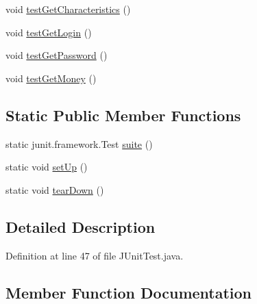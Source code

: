 \begin{DoxyCompactItemize}
\item 
void \hyperlink{classes_1_1deusto_1_1server_1_1_j_unit_test_adfe6c8de32fe489f31f62338a475729e}{test\+Get\+Characteristics} ()
\item 
void \hyperlink{classes_1_1deusto_1_1server_1_1_j_unit_test_a6c7354d3207f6f6e8778d1b85fd31746}{test\+Get\+Login} ()
\item 
void \hyperlink{classes_1_1deusto_1_1server_1_1_j_unit_test_aac72817037da417d5eb5b32078971398}{test\+Get\+Password} ()
\item 
void \hyperlink{classes_1_1deusto_1_1server_1_1_j_unit_test_a6204483b84dccff7e6dd2e98d9b20b1b}{test\+Get\+Money} ()
\end{DoxyCompactItemize}
\subsection*{Static Public Member Functions}
\begin{DoxyCompactItemize}
\item 
static junit.\+framework.\+Test \hyperlink{classes_1_1deusto_1_1server_1_1_j_unit_test_ae981ce8acebd33a65ebe3160ceeac17b}{suite} ()
\item 
static void \hyperlink{classes_1_1deusto_1_1server_1_1_j_unit_test_af386e60b196afb70391c05e71563efd6}{set\+Up} ()
\item 
static void \hyperlink{classes_1_1deusto_1_1server_1_1_j_unit_test_a6773c13994c33488b0f6ca363c92417a}{tear\+Down} ()
\end{DoxyCompactItemize}


\subsection{Detailed Description}


Definition at line 47 of file J\+Unit\+Test.\+java.



\subsection{Member Function Documentation}
\mbox{\label{classes_1_1deusto_1_1server_1_1_j_unit_test_af8d8ab1be153c202fa1b5210c289cf9e}} 
